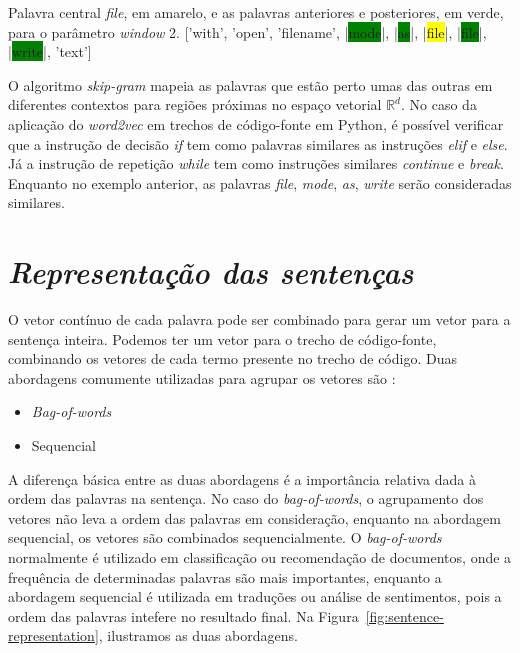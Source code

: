 \begin{mypythonembedding}{Palavra central \textit{file}, em amarelo, e as palavras anteriores e posteriores, em verde, para o parâmetro \textit{window} 2.}
  ['with', 'open', 'filename', |\colorbox{green}{mode}|, |\colorbox{green}{as}|, |\colorbox{yellow}{file}|, |\colorbox{green}{file}|, |\colorbox{green}{write}|, 'text']
\end{mypythonembedding}

O algoritmo \textit{skip-gram} mapeia as palavras que estão perto umas das outras em diferentes contextos para regiões próximas no espaço vetorial $\mathbb{R}^{d}$. No caso da aplicação do \textit{word2vec} em trechos de código-fonte em Python, é possível verificar que a instrução de decisão \emph{if} tem como palavras similares as instruções \emph{elif} e \emph{else}. Já a instrução de repetição \emph{while} tem como instruções similares \emph{continue} e \textit{break}. Enquanto no exemplo anterior, as palavras \emph{file}, \emph{mode}, \emph{as}, \emph{write} serão consideradas similares. 


\section{\textit{Representação das sentenças}}
\label{sec:representacao-das-sentencas-fundamentacao-teorica}

O vetor contínuo de cada palavra pode ser combinado para gerar um vetor para a sentença inteira. Podemos ter um vetor para o trecho de código-fonte, combinando os vetores de cada termo presente no trecho de código. Duas abordagens comumente utilizadas para agrupar os vetores são \citep{cambronero-deep-learning-code-search:2019}:

\begin{itemize}
    \item \textit{Bag-of-words}
    \item Sequencial
\end{itemize}

A diferença básica entre as duas abordagens é a importância relativa dada à ordem das palavras na sentença. No caso do \textit{bag-of-words}, o agrupamento dos vetores não leva a ordem das palavras em consideração, enquanto na abordagem sequencial, os vetores são combinados sequencialmente. O \textit{bag-of-words} normalmente é utilizado em classificação ou recomendação de documentos, onde a frequência de determinadas palavras são mais importantes, enquanto a abordagem sequencial é utilizada em traduções ou análise de sentimentos, pois a ordem das palavras intefere no resultado final. Na Figura~\ref{fig:sentence-representation}, ilustramos as duas abordagens.

